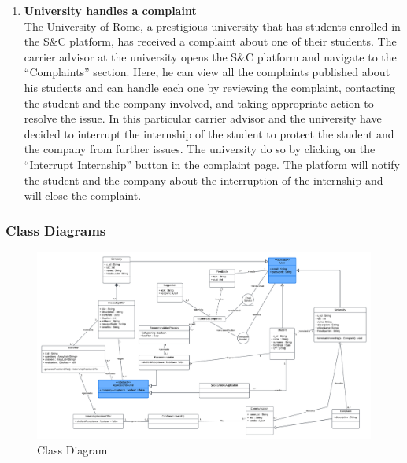 \begin{enumerate}
    \item \textbf{\textcolor{titleColor}{University handles a complaint}}\\
        The University of Rome, a prestigious university that has students enrolled in the S\&C platform, has received a complaint about one of their students. The carrier advisor at the university opens the S\&C platform and navigate to the “Complaints” section. Here, he can view all the complaints published about his students and can handle each one by reviewing the complaint, contacting the student and the company involved, and taking appropriate action to resolve the issue.
        In this particular carrier advisor and the university have decided to interrupt the internship of the student to protect the student and the company from further issues. The university do so by clicking on the “Interrupt Internship” button in the complaint page. The platform will notify the student and the company about the interruption of the internship and will close the complaint.
\end{enumerate}


\subsubsection{Class Diagrams}
\begin{figure}[H]
    \centering
    \includegraphics[width=\linewidth]{Images/ClassDiagram1.1.png}
    \caption{Class Diagram}
    \label{fig:ClassDiagram}
\end{figure}
\newpage
